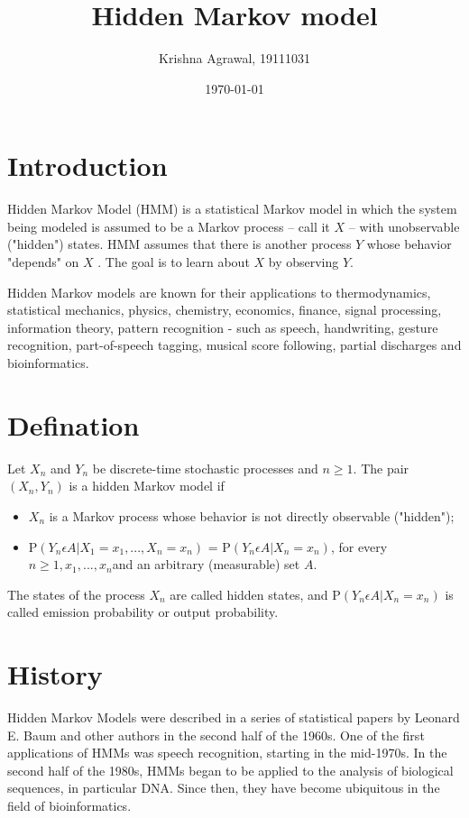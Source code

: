 \documentclass{article}
\title{Hidden Markov model}
\author{Krishna Agrawal, 19111031}
\date{\today}
\begin{document}
\maketitle

\section*{Introduction}

Hidden Markov Model (HMM) is a statistical Markov model in which the system being modeled is assumed to be a Markov process – call it $ X $ – with unobservable ("hidden") states. HMM assumes that there is another process $Y$ whose behavior "depends" on $ X $ . The goal is to learn about $ X $ by observing $ Y $. 

Hidden Markov models are known for their applications to thermodynamics, statistical mechanics, physics, chemistry, economics, finance, signal processing, information theory, pattern recognition - such as speech, handwriting, gesture recognition, part-of-speech tagging, musical score following, partial discharges and bioinformatics.

\section*{Defination}

Let $ X_n $ and $ Y_n $ be discrete-time stochastic processes and $ n \geq 1 $. The pair $ (X_{n},Y_{n}) $ is a hidden Markov model if

\begin{itemize}

\item $ X_n $  is a Markov process whose behavior is not directly observable ("hidden");

\item P$ (Y_n \epsilon A  | X_1 = x_1,...,X_n = x_n)$ =  P$ (Y_n \epsilon A  | X_n = x_n) $, for every $ n \geq 1 , x_1,...,x_n $and an arbitrary (measurable) set $ A $. 


\end{itemize}

The states of the process $ X_n $ are called hidden states, and P$ (Y_n \epsilon A  | X_n = x_n) $ is called emission probability or output probability.

\section*{History}
Hidden Markov Models were described in a series of statistical papers by Leonard E. Baum and other authors in the second half of the 1960s. One of the first applications of HMMs was speech recognition, starting in the mid-1970s. In the second half of the 1980s, HMMs began to be applied to the analysis of biological sequences, in particular DNA. Since then, they have become ubiquitous in the field of bioinformatics.
\end{document}

